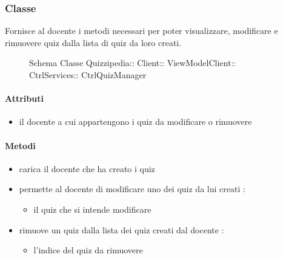 \subsubsection{Classe }
Fornisce al docente i metodi necessari per poter visualizzare, modificare e rimuovere quiz dalla lista di quiz da loro creati.
\begin{figure}[H]
\centering
\noindent{}
\caption[Schema Classe CtrlQuizManager]{Schema Classe Quizzipedia:: Client:: ViewModelClient:: CtrlServices:: CtrlQuizManager}
\end{figure}
\paragraph{Attributi}
\begin{itemize}
\item {}
\newline
il docente a cui appartengono i quiz da modificare o rimuovere
\end{itemize}
\paragraph{Metodi}
\begin{itemize}
\item {}
\newline
carica il docente che ha creato i quiz
\newline
\item {}
\newline
permette al docente di modificare uno dei quiz da lui creati
\newline
{} :
\begin{itemize}
\item {}
\newline
il quiz che si intende modificare
\end{itemize}
\item {}
\newline
rimuove un quiz dalla lista dei quiz creati dal docente
\newline
{} :
\begin{itemize}
\item {}
\newline
l'indice del quiz da rimuovere
\end{itemize}
\end{itemize}
